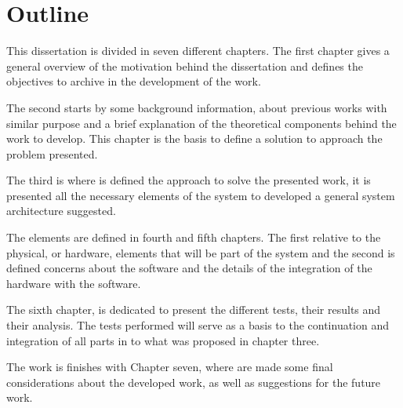 

\section{Outline}
This dissertation is divided in seven different chapters. The first chapter gives a general overview of the motivation behind the dissertation and defines the objectives to archive in the development of the work. 

The second starts by some background information, about previous works with similar purpose and a brief explanation of the theoretical components behind the work to develop. This chapter is the basis to define a solution to approach the problem presented.

The third is where is defined the approach to solve the presented work, it is presented all the necessary elements of the system to developed a general system architecture suggested.

The elements are defined in fourth and fifth chapters. The first relative to the physical, or hardware, elements that will be part of the system and the second is defined concerns about the software and the details of the integration of the hardware with the software.

The sixth chapter, is dedicated to present the different tests, their results and their analysis. The tests performed will serve as a basis to the continuation and integration of all parts in to what was proposed in chapter three. 

The work is finishes with Chapter seven, where are made some final considerations about the developed work, as well as suggestions for the future work.
\clearpage
